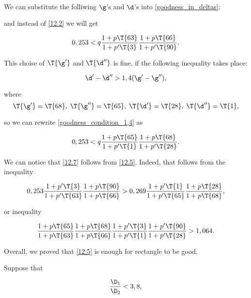 We can substitute the folliwing $\g$'s and $\d$'s
into \ref{goodness_in_deltas}:


and instead of \ref{12.2} we will get

\begin{equation}\label{12.5}
	0,253 < q
	\dfrac{1 + p \T{63}}{1 + p' \T{3}}
	\dfrac{1 + p \T{66}}{1 + p' \T{90}}.
\end{equation}

This choise of $\T{\g'}$ and $\T{\d''}$ is fine,
if the following inequality takes place:

\begin{equation}\label{goodness_condition_1,4}
	\d' - \d'' > 1,4 (\g' - \g''),
\end{equation}

where 
\begin{equation*}
	\T{\g'} = \T{68},\;
	\T{\g''} = \T{65},\;
	\T{\d'} = \T{28},\;
	\T{\d''} = \T{1},
\end{equation*}

so we can rewrite \ref{goodness_condition_1,4} as

\begin{equation}\label{12.7}
	0,253 < q
	\dfrac{1 + p \T{65}}{1 + p' \T{1}}
	\dfrac{1 + p \T{68}}{1 + p' \T{28}}.
\end{equation}

We can notice that \ref{12.7} follows from \ref{12.5}. Indeed, that follows from the inequality

\begin{equation*}
	0,253
	\dfrac{1 + p' \T{3}}{1 + p' \T{63}}
	\dfrac{1 + p \T{90}}{1 + p \T{66}}
	>
	0,269
	\dfrac{1 + p' \T{1}}{1 + p' \T{65}}
	\dfrac{1 + p \T{28}}{1 + p \T{68}},
\end{equation*}

or inequality

\begin{equation*}
	\dfrac{1 + p \T{65}}{1 + p \T{63}}
	\dfrac{1 + p \T{68}}{1 + p \T{66}}
	\dfrac{1 + p' \T{3}}{1 + p' \T{1}}
	\dfrac{1 + p' \T{90}}{1 + p' \T{28}}
	>
	1,064.
\end{equation*}

Overall, we proved that \ref{12.5} is enough for rectangle to be good.

Suppose that

\begin{equation}\label{goodness_condition_3,8}
	\dfrac{\D_1}{\D_2} < 3,8,
\end{equation}

